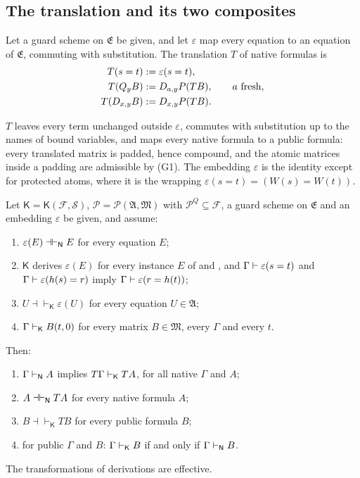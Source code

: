 \subsection{The translation and its two composites}

\begin{definition}
\label{guard:def:T}
Let a guard scheme on $\mathfrak E$ be given, and let $\varepsilon$ map
every equation to an equation of $\mathfrak E$, commuting with substitution.
The translation $T$ of native formulas is
\begin{align*}
 T(s=t) &\mathrel{:=} \varepsilon(s=t),\\
 T(Q_{y}B) &\mathrel{:=} D_{a,y}P(TB), \qquad a \text{ fresh},\\
 T(D_{x,y}B) &\mathrel{:=} D_{x,y}P(TB).
\end{align*}
\end{definition}

$T$ leaves every term unchanged outside $\varepsilon$, commutes with
substitution up to the names of bound variables, and maps every native
formula to a public formula: every translated matrix is padded, hence
compound, and the atomic matrices inside a padding are admissible by (G1).
The embedding $\varepsilon$ is the identity except for protected atoms,
where it is the wrapping $\varepsilon(s=t)=(W(s)=W(t))$.

\begin{theorem}
\label{guard:thm:public}
Let $\mathsf K=\mathsf K(\mathcal F,\mathcal S)$,
$\mathcal P=\mathcal P(\mathfrak A,\mathfrak M)$ with
$\mathcal P^{Q}\subseteq\mathcal F$, a guard scheme on $\mathfrak E$ and an
embedding $\varepsilon$ be given, and assume:
\begin{enumerate}[label=\textup{(T\arabic*)}]
\item $\varepsilon(E)\dashv\vdash_{\mathsf{N}}E$ for every equation $E$;
\item $\mathsf K$ derives $\varepsilon(E)$ for every instance $E$ of
  and , and $\Gamma\vdash\varepsilon(s=t)$ and
 $\Gamma\vdash\varepsilon(h(s)=r)$ imply
 $\Gamma\vdash\varepsilon(r=h(t))$;
\item $U\dashv\vdash_{\mathsf K}\varepsilon(U)$ for every equation
 $U\in\mathfrak A$;
\item $\Gamma\vdash_{\mathsf K}B(t,0)$ for every matrix
 $B\in\mathfrak M$, every $\Gamma$ and every $t$.
\end{enumerate}
Then:
\begin{enumerate}[label=\textup{(\alph*)}]
\item $\Gamma\vdash_{\mathsf{N}}A$ implies $T\Gamma\vdash_{\mathsf K}TA$, for
 all native $\Gamma$ and $A$;
\item $A\dashv\vdash_{\mathsf{N}}TA$ for every native formula $A$;
\item $B\dashv\vdash_{\mathsf K}TB$ for every public formula $B$;
\item for public $\Gamma$ and $B$:
 $\Gamma\vdash_{\mathsf K}B$ if and only if $\Gamma\vdash_{\mathsf{N}}B$.
\end{enumerate}
The transformations of derivations are effective.
\end{theorem}

